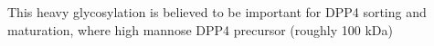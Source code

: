 This heavy glycosylation is believed to be important for DPP4 sorting and maturation, where high mannose DPP4 precursor (roughly 100 kDa)  \cite{Matter_1991}